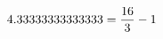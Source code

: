 \documentclass[preview]{standalone}
\begin{document}
\begin{align*}
\special{dvisvgm:raw <g id='unique000'>}4.33333333333333 = \frac{16}{3}-1\special{dvisvgm:raw </g>}
\end{align*}
\end{document}
